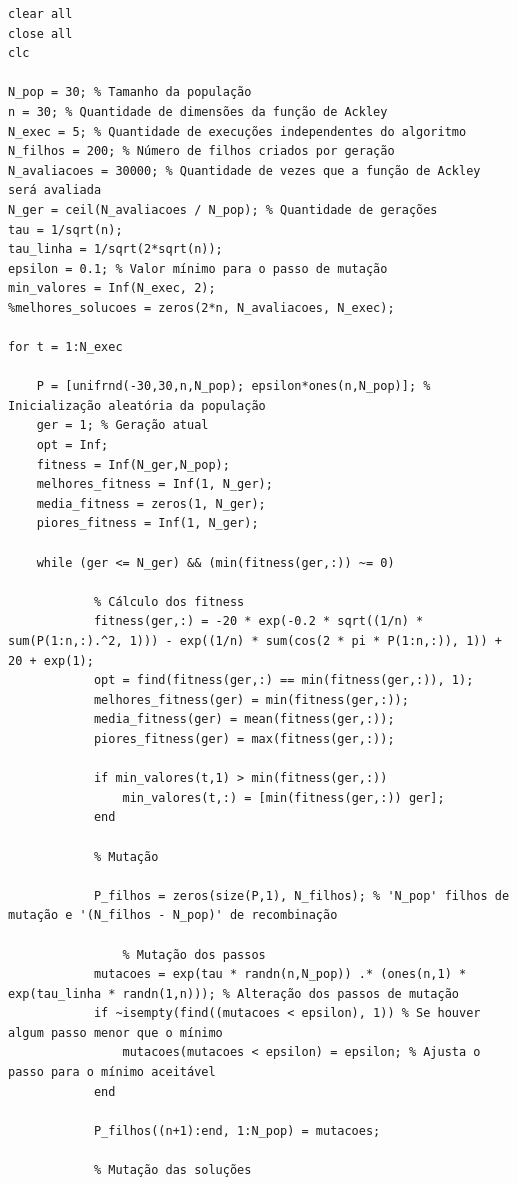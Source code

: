 \documentclass{report}
\begin{document}
	\begin{lstlisting}
clear all
close all
clc

N_pop = 30; % Tamanho da população
n = 30; % Quantidade de dimensões da função de Ackley
N_exec = 5; % Quantidade de execuções independentes do algoritmo
N_filhos = 200; % Número de filhos criados por geração
N_avaliacoes = 30000; % Quantidade de vezes que a função de Ackley será avaliada
N_ger = ceil(N_avaliacoes / N_pop); % Quantidade de gerações
tau = 1/sqrt(n);
tau_linha = 1/sqrt(2*sqrt(n));
epsilon = 0.1; % Valor mínimo para o passo de mutação
min_valores = Inf(N_exec, 2);
%melhores_solucoes = zeros(2*n, N_avaliacoes, N_exec);

for t = 1:N_exec

    P = [unifrnd(-30,30,n,N_pop); epsilon*ones(n,N_pop)]; % Inicialização aleatória da população
    ger = 1; % Geração atual
    opt = Inf;
    fitness = Inf(N_ger,N_pop);
    melhores_fitness = Inf(1, N_ger);
    media_fitness = zeros(1, N_ger);
    piores_fitness = Inf(1, N_ger);

    while (ger <= N_ger) && (min(fitness(ger,:)) ~= 0)
            
            % Cálculo dos fitness
            fitness(ger,:) = -20 * exp(-0.2 * sqrt((1/n) * sum(P(1:n,:).^2, 1))) - exp((1/n) * sum(cos(2 * pi * P(1:n,:)), 1)) + 20 + exp(1);
            opt = find(fitness(ger,:) == min(fitness(ger,:)), 1);
            melhores_fitness(ger) = min(fitness(ger,:));
            media_fitness(ger) = mean(fitness(ger,:)); 
            piores_fitness(ger) = max(fitness(ger,:));

            if min_valores(t,1) > min(fitness(ger,:))
                min_valores(t,:) = [min(fitness(ger,:)) ger];
            end

            % Mutação

            P_filhos = zeros(size(P,1), N_filhos); % 'N_pop' filhos de mutação e '(N_filhos - N_pop)' de recombinação
            
                % Mutação dos passos
            mutacoes = exp(tau * randn(n,N_pop)) .* (ones(n,1) * exp(tau_linha * randn(1,n))); % Alteração dos passos de mutação
            if ~isempty(find((mutacoes < epsilon), 1)) % Se houver algum passo menor que o mínimo
                mutacoes(mutacoes < epsilon) = epsilon; % Ajusta o passo para o mínimo aceitável
            end
                
            P_filhos((n+1):end, 1:N_pop) = mutacoes;

            % Mutação das soluções
                

\end{lstlisting}
\end{document}
